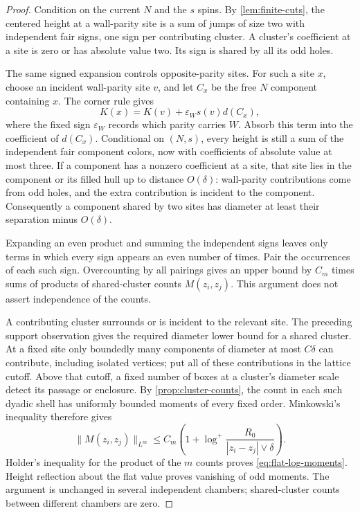 \begin{proof}
Condition on the current $N$ and the $s$ spins. By \cref{lem:finite-cuts},
the centered height at a wall-parity site is a sum of jumps of size two with
independent fair signs, one sign per contributing cluster. A cluster's
coefficient at a site is zero or has absolute value two. Its sign is shared
by all its odd holes.

The same signed expansion controls opposite-parity sites. For such a site
$x$, choose an incident wall-parity site $v$, and let $C_x$ be the free
$N$ component containing $x$. The corner rule gives
\[
          K(x)=K(v)+\varepsilon_W s(v)d(C_x),
\]
where the fixed sign $\varepsilon_W$ records which parity carries $W$.
Absorb this term into the coefficient of $d(C_x)$. Conditional on $(N,s)$,
every height is still a sum of the independent fair component colors,
now with coefficients of absolute value at most three. If a component has
a nonzero coefficient at a site, that site lies in the component or its
filled hull up to distance $O(\delta)$: wall-parity contributions come from
odd holes, and the extra contribution is incident to the component.
Consequently a component shared by two sites has diameter at least their
separation minus $O(\delta)$.

Expanding an even product and summing the independent signs leaves only
terms in which every sign appears an even number of times.
Pair the occurrences of each such sign. Overcounting by all pairings gives
an upper bound by $C_m$ times sums of products of shared-cluster counts
$M(z_i,z_j)$. This argument does not assert independence of the counts.

A contributing cluster surrounds or is incident to the relevant site.
The preceding support observation gives the required diameter lower bound
for a shared cluster. At a fixed site only boundedly many components of
diameter at most $C\delta$ can contribute, including isolated vertices;
put all of these contributions in the lattice cutoff. Above that cutoff,
a fixed number of boxes at a cluster's diameter scale detect its passage
or enclosure. By
\cref{prop:cluster-counts}, the count in each such dyadic shell has uniformly
bounded moments of every fixed order. Minkowski's inequality therefore gives
\[
 \|M(z_i,z_j)\|_{L^m}
 \le C_m\left(1+\log^+\frac{R_0}{|z_i-z_j|\vee\delta}\right).
\]
Holder's inequality for the product of the $m$ counts proves
\cref{eq:flat-log-moments}. Height reflection about the flat value proves
vanishing of odd moments. The argument is unchanged in several independent
chambers; shared-cluster counts between different chambers are zero.


\end{proof}
